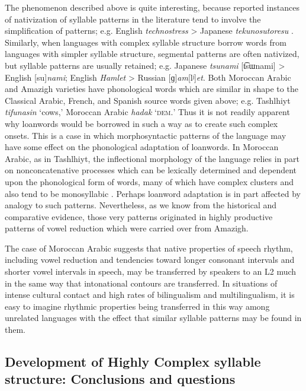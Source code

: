   The phenomenon described above is quite interesting, because reported instances of nativization of syllable patterns in the literature tend to involve the simplification of patterns; e.g. English \textit{technostress} > Japanese \textit{tekunosutoresu} \citep[69]{Kay1995}. Similarly, when languages with complex syllable structure borrow words from languages with simpler syllable structure, segmental patterns are often nativized, but syllable patterns are usually retained; e.g. Japanese \textit{tsunami} [t͡sɯnami] > English [su]\textit{nami}; English \textit{Hamlet} > Russian [ɡ]\textit{am}[lʲ]\textit{et}. Both Moroccan Arabic and Amazigh varieties have phonological words which are similar in shape to the Classical Arabic, French, and Spanish source words given above; e.g. Tashlhiyt \textit{tifunasin} ‘cows,’ Moroccan Arabic \textit{hadak} ‘\textsc{dem.}’ Thus it is not readily apparent why loanwords would be borrowed in such a way as to create such complex onsets. This is a case in which morphosyntactic patterns of the language may have some effect on the phonological adaptation of loanwords. In Moroccan Arabic, as in Tashlhiyt, the inflectional morphology of the language relies in part on nonconcatenative processes which can be lexically determined and dependent upon the phonological form of words, many of which have complex clusters and also tend to be monosyllabic \citep{Heath2007}. Perhaps loanword adaptation is in part affected by analogy to such patterns. Nevertheless, as we know from the historical and comparative evidence, those very patterns originated in highly productive patterns of vowel reduction which were carried over from Amazigh.

  The case of Moroccan Arabic suggests that native properties of speech rhythm, including vowel reduction and tendencies toward longer consonant intervals and shorter vowel intervals in speech, may be transferred by speakers to an L2 much in the same way that intonational contours are transferred. In situations of intense cultural contact and high rates of bilingualism and multilingualism, it is easy to imagine rhythmic properties being transferred in this way among unrelated languages with the effect that similar syllable patterns may be found in them.

\subsection{Development of Highly Complex syllable structure: Conclusions and questions}\label{sec:8.4.6}

